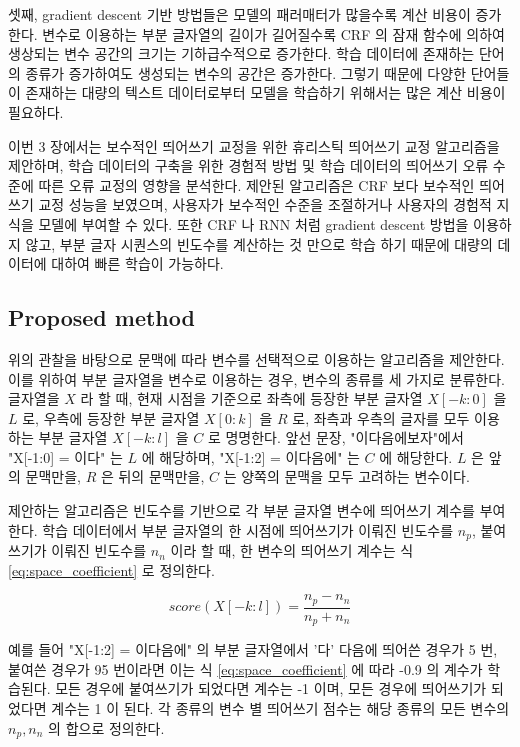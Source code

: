 \documentclass[11pt]{article}
\begin{document}
셋째, gradient descent 기반 방법들은 모델의 패러매터가 많을수록 계산 비용이 증가한다.
변수로 이용하는 부분 글자열의 길이가 길어질수록 CRF 의 잠재 함수에 의하여 생상되는 변수 공간의 크기는 기하급수적으로 증가한다.
학습 데이터에 존재하는 단어의 종류가 증가하여도 생성되는 변수의 공간은 증가한다.
그렇기 때문에 다양한 단어들이 존재하는 대량의 텍스트 데이터로부터 모델을 학습하기 위해서는 많은 계산 비용이 필요하다.

이번 3 장에서는 보수적인 띄어쓰기 교정을 위한 휴리스틱 띄어쓰기 교정 알고리즘을 제안하며, 학습 데이터의 구축을 위한 경험적 방법 및 학습 데이터의 띄어쓰기 오류 수준에 따른 오류 교정의 영향을 분석한다.
제안된 알고리즘은 CRF 보다 보수적인 띄어쓰기 교정 성능을 보였으며, 사용자가 보수적인 수준을 조절하거나 사용자의 경험적 지식을 모델에 부여할 수 있다.
또한 CRF 나 RNN 처럼 gradient descent 방법을 이용하지 않고, 부분 글자 시퀀스의 빈도수를 계산하는 것 만으로 학습 하기 때문에 대량의 데이터에 대하여 빠른 학습이 가능하다.

\subsection{Proposed method}

위의 관찰을 바탕으로 문맥에 따라 변수를 선택적으로 이용하는 알고리즘을 제안한다.
이를 위하여 부분 글자열을 변수로 이용하는 경우, 변수의 종류를 세 가지로 분류한다.
글자열을 $X$ 라 할 때, 현재 시점을 기준으로 좌측에 등장한 부분 글자열 $X[-k:0]$ 을 $L$ 로, 우측에 등장한 부분 글자열 $X[0:k]$ 을 $R$ 로, 좌측과 우측의 글자를 모두 이용하는 부분 글자열 $X[-k:l]$ 을 $C$ 로 명명한다.
앞선 문장, "이다음에보자"에서 "X[-1:0] = 이다" 는 $L$ 에 해당하며, "X[-1:2] = 이다음에" 는 $C$ 에 해당한다.
$L$ 은 앞의 문맥만을, $R$ 은 뒤의 문맥만을, $C$ 는 양쪽의 문맥을 모두 고려하는 변수이다.

제안하는 알고리즘은 빈도수를 기반으로 각 부분 글자열 변수에 띄어쓰기 계수를 부여한다.
학습 데이터에서 부분 글자열의 한 시점에 띄어쓰기가 이뤄진 빈도수를 $n_p$, 붙여쓰기가 이뤄진 빈도수를 $n_n$ 이라 할 때, 한 변수의 띄어쓰기 계수는 식 \ref{eq:space_coefficient} 로 정의한다.

\begin{equation}
  \label{eq:space_coefficient}
  score(X[-k:l]) = \frac{n_p - n_n}{n_p + n_n}
\end{equation}

예를 들어 "X[-1:2] = 이다음에" 의 부분 글자열에서 '다' 다음에 띄어쓴 경우가 5 번, 붙여쓴 경우가 95 번이라면 이는 식 \ref{eq:space_coefficient} 에 따라 -0.9 의 계수가 학습된다.
모든 경우에 붙여쓰기가 되었다면 계수는 -1 이며, 모든 경우에 띄어쓰기가 되었다면 계수는 1 이 된다.
각 종류의 변수 별 띄어쓰기 점수는 해당 종류의 모든 변수의 $n_p, n_n$ 의 합으로 정의한다.
\end{document}
